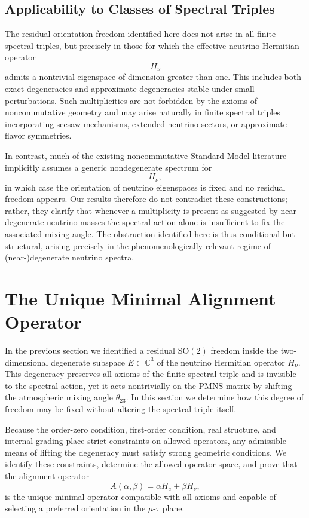 \subsection{Applicability to Classes of Spectral Triples}

The residual orientation freedom identified here does not arise in all finite spectral triples, but precisely in those for which the effective neutrino Hermitian operator
\[
H_\nu
\]
admits a nontrivial eigenspace of dimension greater than one. This includes both exact degeneracies and approximate degeneracies stable under small perturbations. Such multiplicities are not forbidden by the axioms of noncommutative geometry and may arise naturally in finite spectral triples incorporating seesaw mechanisms, extended neutrino sectors, or approximate flavor symmetries.

In contrast, much of the existing noncommutative Standard Model literature implicitly assumes a generic nondegenerate spectrum for
\[
H_\nu,
\]
in which case the orientation of neutrino eigenspaces is fixed and no residual freedom appears. Our results therefore do not contradict these constructions; rather, they clarify that whenever a multiplicity is present as suggested by near-degenerate neutrino masses the spectral action alone is insufficient to fix the associated mixing angle. The obstruction identified here is thus conditional but structural, arising precisely in the phenomenologically relevant regime of (near-)degenerate neutrino spectra.


\section{The Unique Minimal Alignment Operator}


In the previous section we identified a residual $\mathrm{SO}(2)$ freedom inside the two-dimensional degenerate subspace $E\subset\mathbb C^3$ of the neutrino Hermitian operator $H_\nu$. This degeneracy preserves all axioms of the finite spectral triple and is invisible to the spectral action, yet it acts nontrivially on the PMNS matrix by shifting the atmospheric mixing angle $\theta_{23}$. In this section we determine how this degree of freedom may be fixed without altering the spectral triple itself.

Because the order-zero condition, first-order condition, real structure, and internal grading place strict constraints on allowed operators, any admissible means of lifting the degeneracy must satisfy strong geometric conditions. We identify these constraints, determine the allowed operator space, and prove that the alignment operator
\[
A(\alpha,\beta)=\alpha H_e + \beta H_\nu,
\]
is the unique minimal operator compatible with all axioms and capable of selecting a preferred orientation in the $\mu$-$\tau$ plane.


